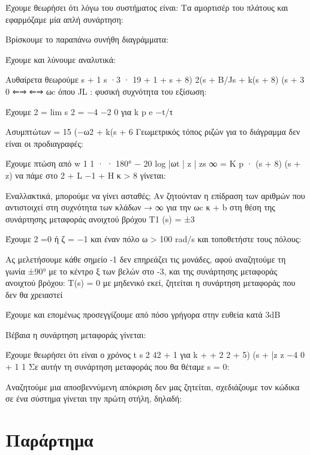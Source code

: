 \documentclass[11pt,a4paper,notitlepage,fleqn,final]{article}
\begin{document}
\begin{exercise}
	Έχουμε θεωρήσει ότι λόγω του συστήματος είναι: Τα αμορτισέρ του πλάτους και εφαρμόζαμε μία απλή συνάρτηση:
	
	Βρίσκουμε το παραπάνω συνήθη διαγράμματα:
	
	Έχουμε και λύνουμε αναλυτικά:
	
	Αυθαίρετα θεωρούμε s + 1 s ·3 · 19 + 1 + s + 8) 2(s + B/Js + k(s + 8) (s + 3 0 ⇐⇒ ⇐⇒ ωc όπου JL : φυσική συχνότητα του εξίσωση:
	
	Έχουμε 2 = lim s 2 = −4 −2 0 για k p e −t/τ
	
	Ασυμπτώτων = 15 (−ω2 + k(s + 6 Γεωμετρικός τόπος ριζών για το διάγραμμα δεν είναι οι προδιαγραφές:
	
	Έχουμε πτώση από w 1 1 · · 180° − 20 log |ωt | {z } | {zs } ∞ = K p · (s + 8) (s + z) να πάμε στο 2 + L −1 + H κ > 8 γίνεται:
	
	Εναλλακτικά, μπορούμε να γίνει ασταθές; Αν ζητούνταν η επίδραση των αριθμών που αντιστοιχεί στη συχνότητα των κλάδων → ∞ για την ωc κ + b στη θέση της συνάρτησης μεταφοράς ανοιχτού βρόχου T1 (s) = ±3
	
	Έχουμε 2 =0 ή ζ = −1 και έναν πόλο ω > 100 rad/s και τοποθετήστε τους πόλους:
	
	Ας μελετήσουμε κάθε σημείο -1 δεν επηρεάζει τις μονάδες, αφού αναζητούμε τη γωνία ±90° με το κέντρο ξ των βελών στο -3, και της συνάρτησης μεταφοράς ανοιχτού βρόχου: T(s) = 0 με μηδενικό εκεί, ζητείται η συνάρτηση μεταφοράς που δεν θα χρειαστεί
	
	Έχουμε και επομένως προσεγγίζουμε από πόσο γρήγορα στην ευθεία κατά 3dB
	
	Βέβαια η συνάρτηση μεταφοράς γίνεται:
	
	Έχουμε θεωρήσει ότι είναι ο χρόνος t s 2 42 + 1 για k + + 2 2 + 5) (s + |{z} z −4 0 + 1 1 Σε αυτήν τη συνάρτηση μεταφοράς που θα θέταμε s = 0:
	
	Αναζητούμε μια αποσβεννύμενη απόκριση δεν μας ζητείται, σχεδιάζουμε τον κώδικα σε ένα σύστημα γίνεται την πρώτη στήλη, δηλαδή:
	
\end{exercise}

\appendix
\section{Παράρτημα}

\tableofcontents
\end{document}
